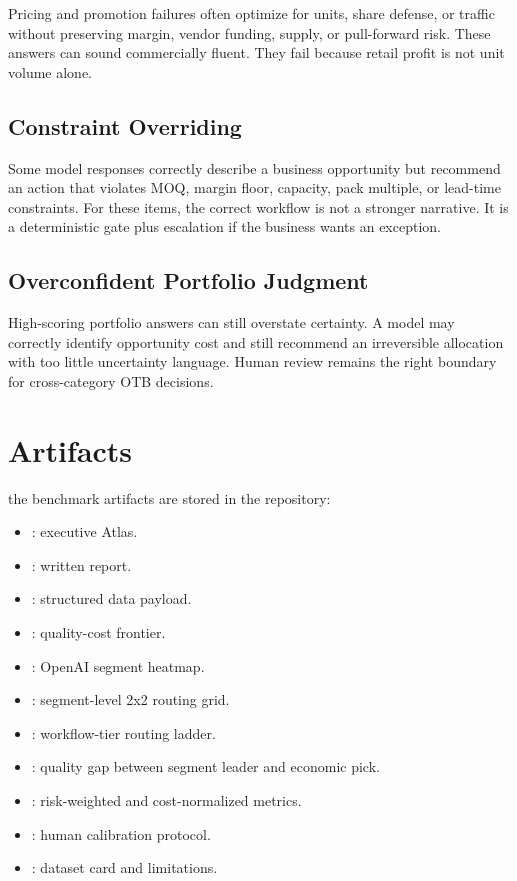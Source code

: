 \documentclass[11pt]{article}
\begin{document}
Pricing and promotion failures often optimize for units, share defense, or traffic without preserving margin, vendor funding, supply, or pull-forward risk. These answers can sound commercially fluent. They fail because retail profit is not unit volume alone.

\subsection{Constraint Overriding}

Some model responses correctly describe a business opportunity but recommend an action that violates MOQ, margin floor, capacity, pack multiple, or lead-time constraints. For these items, the correct workflow is not a stronger narrative. It is a deterministic gate plus escalation if the business wants an exception.

\subsection{Overconfident Portfolio Judgment}

High-scoring portfolio answers can still overstate certainty. A model may correctly identify opportunity cost and still recommend an irreversible allocation with too little uncertainty language. Human review remains the right boundary for cross-category OTB decisions.

\section{Artifacts}

the benchmark artifacts are stored in the repository:

\begin{itemize}[leftmargin=*]
  \item {}: executive Atlas.
  \item {}: written report.
  \item {}: structured data payload.
  \item {}: quality-cost frontier.
  \item {}: OpenAI segment heatmap.
  \item {}: segment-level 2x2 routing grid.
  \item {}: workflow-tier routing ladder.
  \item {}: quality gap between segment leader and economic pick.
  \item {}: risk-weighted and cost-normalized metrics.
  \item {}: human calibration protocol.
  \item {}: dataset card and limitations.
\end{itemize}
\end{document}
